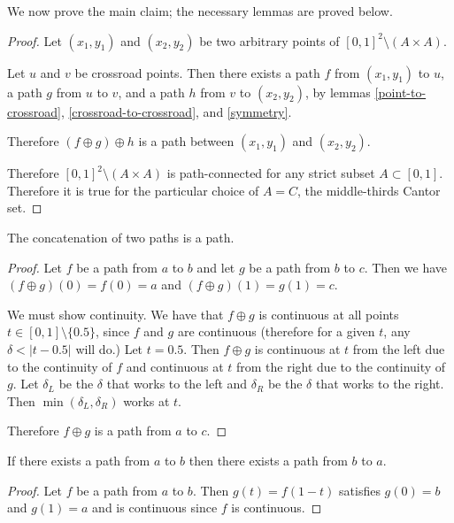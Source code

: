 We now prove the main claim; the necessary lemmas are proved below.

\begin{proof}
  Let $(x_1, y_1)$ and $(x_2, y_2)$ be two arbitrary points of $[0, 1]^2 \setminus (A \times A)$.

  Let $u$ and $v$ be crossroad points. Then there exists a path $f$ from $(x_1, y_1)$ to $u$, a path $g$
  from $u$ to $v$, and a path $h$ from $v$ to $(x_2, y_2)$, by lemmas \ref{point-to-crossroad},
  \ref{crossroad-to-crossroad}, and \ref{symmetry}.

  Therefore $(f \oplus g) \oplus h$ is a path between $(x_1, y_1)$ and $(x_2, y_2)$.

  Therefore $[0, 1]^2 \setminus (A \times A)$ is path-connected for any strict subset $A \subset [0, 1]$.
  Therefore it is true for the particular choice of $A = C$, the middle-thirds Cantor set.
\end{proof}


\begin{lemma}\label{concatenation}
  The concatenation of two paths is a path.
\end{lemma}

\begin{proof}
  Let $f$ be a path from $a$ to $b$ and let $g$ be a path from $b$ to $c$. Then we
  have $(f \oplus g)(0) = f(0) = a$ and $(f \oplus g)(1) = g(1) = c$.

  We must show continuity. We have that $f \oplus g$ is continuous at all
  points $t \in [0, 1] \setminus \{0.5\}$, since $f$ and $g$ are continuous (therefore for a given $t$,
  any $\delta < |t - 0.5|$ will do.) Let $t = 0.5$. Then $f \oplus g$ is continuous at $t$ from the left due to
  the continuity of $f$ and continuous at $t$ from the right due to the continuity of $g$. Let $\delta_L$ be
  the $\delta$ that works to the left and $\delta_R$ be the $\delta$ that works to the right.
  Then $\min(\delta_L, \delta_R)$ works at $t$.

  Therefore $f \oplus g$ is a path from $a$ to $c$.
\end{proof}

\begin{lemma}\label{symmetry}
  If there exists a path from $a$ to $b$ then there exists a path from $b$ to $a$.
\end{lemma}

\begin{proof}
  Let $f$ be a path from $a$ to $b$. Then $g(t) = f(1 - t)$ satisfies $g(0) = b$ and $g(1) = a$ and is
  continuous since $f$ is continuous.
\end{proof}

